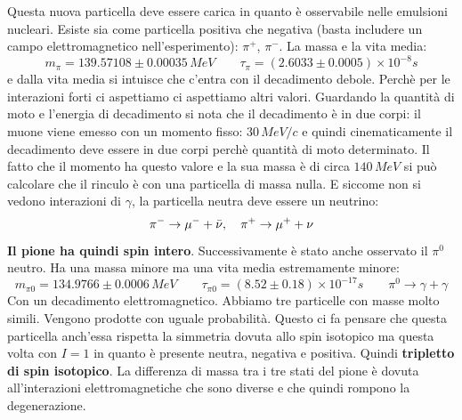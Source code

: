Questa nuova particella deve essere carica in quanto è osservabile nelle emulsioni nucleari. Esiste sia come particella positiva che negativa (basta includere un campo elettromagnetico nell'esperimento): $\pi^+$, $\pi^-$. La massa e la vita media: 
\begin{equation*}
    m_\pi=139.57108\pm0.00035\,MeV \qquad \tau_\pi=(2.6033\pm0.0005)\times10^{-8}s
\end{equation*}
e dalla vita media si intuisce che c'entra con il decadimento debole. Perchè per le interazioni forti ci aspettiamo ci aspettiamo altri valori. Guardando la quantità di moto e l'energia di decadimento si nota che il decadimento è in due corpi: il muone viene emesso con un momento fisso: $30\,MeV/c$ e quindi cinematicamente il decadimento deve essere in due corpi perchè quantità di moto determinato. Il fatto che il momento ha questo valore e la sua massa è di circa $140\,MeV$ si può calcolare che il rinculo è con una particella di massa nulla. E siccome non si vedono interazioni di $\gamma$, la particella neutra deve essere un neutrino:
\begin{equation*}
    \pi^-\to\mu^-+\Bar{\nu}, \quad \pi^+\to\mu^++\nu
\end{equation*}
\textbf{Il pione ha quindi spin intero}. Successivamente è stato anche osservato il $\pi^0$ neutro. Ha una massa minore ma una vita media estremamente minore:
\begin{equation*}
    m_{\pi0}=134.9766\pm0.0006\,MeV \qquad \tau_{\pi0}=(8.52\pm0.18)\times10^{-17}s \qquad \pi^0\to\gamma+\gamma
\end{equation*}
Con un decadimento elettromagnetico. Abbiamo tre particelle con masse molto simili. Vengono prodotte con uguale probabilità. Questo ci fa pensare che questa particella anch'essa rispetta la simmetria dovuta allo spin isotopico ma questa volta con $I=1$ in quanto è presente neutra, negativa e positiva. Quindi \textbf{tripletto di spin isotopico}. La differenza di massa tra i tre stati del pione è dovuta all'interazioni elettromagnetiche che sono diverse e che quindi rompono la degenerazione.
